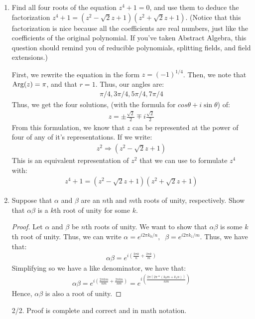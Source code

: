 \begin{enumerate}
    \item Find all four roots of the equation $z^4+1 =0$, and use them to deduce the factorization $z^4+1 = (z^2-\sqrt{2}z+1)(z^2+\sqrt{2}z+1)$. (Notice that this factorization is nice because all the coefficients are real numbers, just like the coefficients of the original polynomial. If you've taken Abstract Algebra, this question should remind you of reducible polynomials, splitting fields, and field extensions.)
	\begin{problem}
		First, we rewrite the equation in the form $z = (-1)^{1/4}$. Then, we note that $\operatorname{Arg}(z)= \pi$, and that $r = 1$. Thus, our angles are:
		\begin{align*}
			\pi/4, 3\pi/4, 5\pi/4, 7\pi/4
		\end{align*}
		Thus, we get the four solutions, (with the formula for $cos\theta + i\sin\theta$) of:
		\begin{align*}
			z = \pm \frac{\sqrt 2}2 \mp i\frac{\sqrt 2}2
		\end{align*}
		From this formulation, we know that $z$ can be represented at the power of four of any of it's representations. If we write:
		\begin{align*}
			z^2 \Rightarrow (z^2 - \sqrt 2 z + 1)
		\end{align*}
		This is an equivalent representation of $z^2$ that we can use to formulate $z^4$ with:
		\begin{align*}
			z^4+1 = (z^2-\sqrt{2}z+1)(z^2+\sqrt{2}z+1)
		\end{align*}
	\end{problem}
    
    \item Suppose that $\alpha$ and $\beta$ are an $n$th and $m$th roots of unity, respectively. Show that $\alpha\beta$ is a $k$th root of unity for some $k$.
	\begin{proof}
		Let $\alpha$ and $\beta$ be $n$th roots of unity. We want to show that $\alpha\beta$ is some $k$th root of unity. \gline{}
		Thus, we can write $\alpha = e^{i2\pi k_0/n},\;\; \beta = e^{i2\pi k_1/m}$. Thus, we have that:
		\begin{align*}
			\alpha\beta = e^{i(\frac{2\pi k}n + \frac{2\pi k}m)}
		\end{align*}
		Simplifying so we have a like denominator, we have that:
		\begin{align*}
			\alpha\beta = e^{i(\frac{2\pi k m}{nm} + \frac{2\pi k n }{nm})}=e^{i(\frac{2\pi(2\pi* (k_0 m+k_1n))}{nm})}
		\end{align*}
		Hence, $\alpha\beta$ is also a root of unity. 
	\end{proof}
	\begin{grade}
		2/2. Proof is complete and correct and in math notation. 
	\end{grade}
\end{enumerate}

